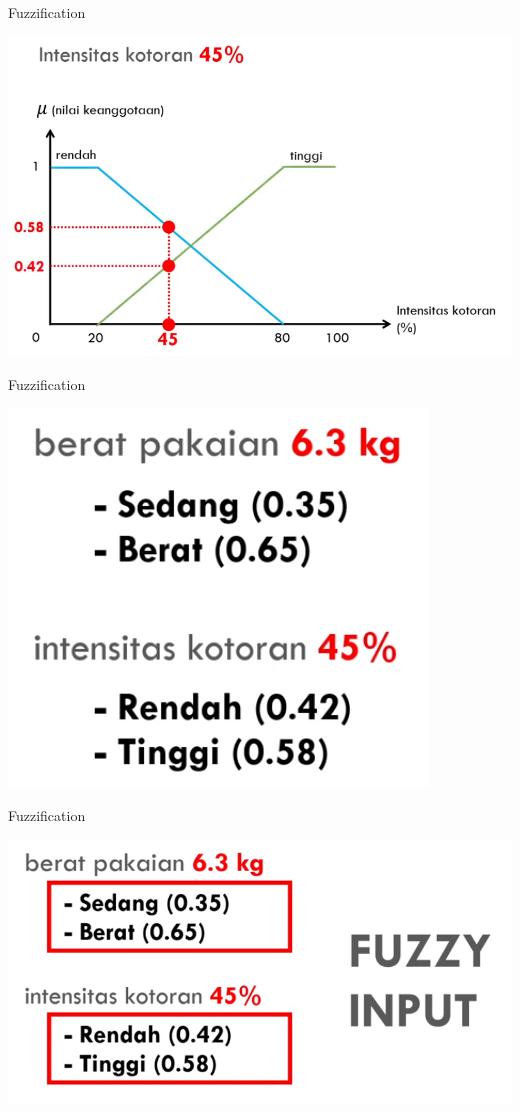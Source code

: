 \documentclass[pdflatex,compress,mathserif]{beamer}
\begin{document}
\begin{frame}{Fuzzification}
	\begin{center}
		\includegraphics[height=0.8\textheight]{img/25}
	\end{center}
\end{frame}

\begin{frame}{Fuzzification}
	\begin{center}
		\includegraphics[height=0.6\textheight]{img/26}
	\end{center}
\end{frame}

\begin{frame}{Fuzzification}
	\begin{center}
		\includegraphics[height=0.6\textheight]{img/27}
	\end{center}
\end{frame}
\end{document}
